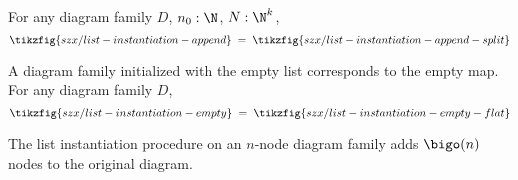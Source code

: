 \begin{lemma}%
    \label{lem:list-instantiation}
    For any diagram family $D$, $n_0 : \N$, $N : \N^k$,
    \[
        \tikzfig{szx/list-instantiation-append}
        \;=\;
        \tikzfig{szx/list-instantiation-append-split}
    \]
\end{lemma}

\begin{lemma}%
    \label{lem:list-init-zero}
    A diagram family initialized with the empty list corresponds to the empty map.
    For any diagram family $D$,
    \[
        \tikzfig{szx/list-instantiation-empty}
        \;=\;
        \tikzfig{szx/list-instantiation-empty-flat}
    \]
\end{lemma}

\begin{lemma}%
    \label{lem:list-instantiation-linear}
    The list instantiation procedure on an $n$-node diagram family adds
    $\bigo(n)$ nodes to the original diagram.
\end{lemma}

